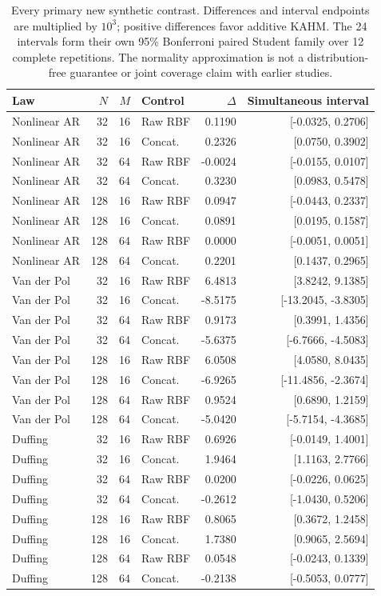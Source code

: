 \begin{table}[!htbp]
\centering\small\setlength{\tabcolsep}{4pt}
\caption{Every primary new synthetic contrast. Differences and interval endpoints are multiplied by $10^3$; positive differences favor additive KAHM. The 24 intervals form their own 95\% Bonferroni paired Student family over 12 complete repetitions. The normality approximation is not a distribution-free guarantee or joint coverage claim with earlier studies.}
\label{tab:utility-intervals}
\begin{tabular}{lrrlrr}
\toprule
Law & $N$ & $M$ & Control & $\Delta$ & Simultaneous interval \\
\midrule
Nonlinear AR & 32 & 16 & Raw RBF & 0.1190 & [-0.0325, 0.2706] \\
Nonlinear AR & 32 & 16 & Concat. & 0.2326 & [0.0750, 0.3902] \\
Nonlinear AR & 32 & 64 & Raw RBF & -0.0024 & [-0.0155, 0.0107] \\
Nonlinear AR & 32 & 64 & Concat. & 0.3230 & [0.0983, 0.5478] \\
Nonlinear AR & 128 & 16 & Raw RBF & 0.0947 & [-0.0443, 0.2337] \\
Nonlinear AR & 128 & 16 & Concat. & 0.0891 & [0.0195, 0.1587] \\
Nonlinear AR & 128 & 64 & Raw RBF & 0.0000 & [-0.0051, 0.0051] \\
Nonlinear AR & 128 & 64 & Concat. & 0.2201 & [0.1437, 0.2965] \\
Van der Pol & 32 & 16 & Raw RBF & 6.4813 & [3.8242, 9.1385] \\
Van der Pol & 32 & 16 & Concat. & -8.5175 & [-13.2045, -3.8305] \\
Van der Pol & 32 & 64 & Raw RBF & 0.9173 & [0.3991, 1.4356] \\
Van der Pol & 32 & 64 & Concat. & -5.6375 & [-6.7666, -4.5083] \\
Van der Pol & 128 & 16 & Raw RBF & 6.0508 & [4.0580, 8.0435] \\
Van der Pol & 128 & 16 & Concat. & -6.9265 & [-11.4856, -2.3674] \\
Van der Pol & 128 & 64 & Raw RBF & 0.9524 & [0.6890, 1.2159] \\
Van der Pol & 128 & 64 & Concat. & -5.0420 & [-5.7154, -4.3685] \\
Duffing & 32 & 16 & Raw RBF & 0.6926 & [-0.0149, 1.4001] \\
Duffing & 32 & 16 & Concat. & 1.9464 & [1.1163, 2.7766] \\
Duffing & 32 & 64 & Raw RBF & 0.0200 & [-0.0226, 0.0625] \\
Duffing & 32 & 64 & Concat. & -0.2612 & [-1.0430, 0.5206] \\
Duffing & 128 & 16 & Raw RBF & 0.8065 & [0.3672, 1.2458] \\
Duffing & 128 & 16 & Concat. & 1.7380 & [0.9065, 2.5694] \\
Duffing & 128 & 64 & Raw RBF & 0.0548 & [-0.0243, 0.1339] \\
Duffing & 128 & 64 & Concat. & -0.2138 & [-0.5053, 0.0777] \\
\bottomrule
\end{tabular}
\end{table}
